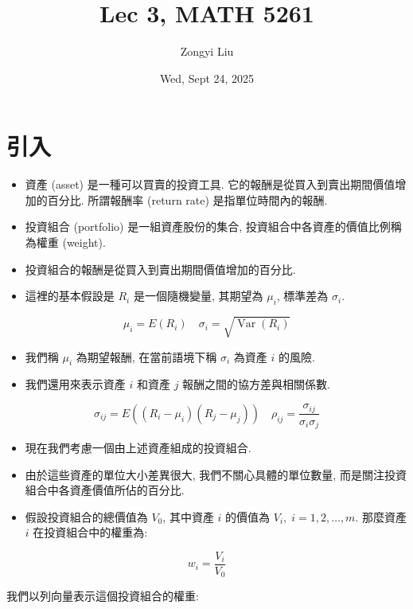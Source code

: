\documentclass[letterpaper]{article}
\title{Lec 3, MATH 5261}
\author{Zongyi Liu}
\date{Wed, Sept 24, 2025}
\begin{document}
		\maketitle
		
		\tableofcontents
		
		\section{引入}
		\begin{itemize}
			\item 資產 (asset) 是一種可以買賣的投資工具. 它的報酬是從買入到賣出期間價值增加的百分比. 所謂報酬率 (return rate) 是指單位時間內的報酬. 
			\item 投資組合 (portfolio) 是一組資產股份的集合, 投資組合中各資產的價值比例稱為權重 (weight).
			\item 投資組合的報酬是從買入到賣出期間價值增加的百分比.
			\item 這裡的基本假設是 $R_{i}$ 是一個隨機變量, 其期望為 $\mu_{i}$, 標準差為 $\sigma_{i}$.
		\end{itemize}
		
		$$
		\mu_{i}=E\left (R_{i}\right) \quad \sigma_{i}=\sqrt{\operatorname{Var}\left (R_{i}\right)}
		$$
		
		\begin{itemize}
			\item 我們稱 $\mu_{i}$ 為期望報酬, 在當前語境下稱 $\sigma_{i}$ 為資產 $i$ 的風險. 
			\item 我們還用來表示資產 $i$ 和資產 $j$ 報酬之間的協方差與相關係數.
		\end{itemize}
		
		$$
		\sigma_{i j}=E\left (\left (R_{i}-\mu_{i}\right)\left (R_{j}-\mu_{j}\right)\right) \quad \rho_{i j}=\frac{\sigma_{i j}}{\sigma_{i} \sigma_{j}}
		$$
		
		\begin{itemize}
			\item 現在我們考慮一個由上述資產組成的投資組合. 
			\item 由於這些資產的單位大小差異很大, 我們不關心具體的單位數量, 而是關注投資組合中各資產價值所佔的百分比. 
			\item 假設投資組合的總價值為 $V_{0}$, 其中資產 $i$ 的價值為 $V_{i}, \; i=1, 2, \ldots, m$. 那麼資產 $i$ 在投資組合中的權重為: 
		\end{itemize}
		
		$$
		w_{i}=\frac{V_{i}}{V_{0}}
		$$
		
		我們以列向量表示這個投資組合的權重: 
		
\end{document}
